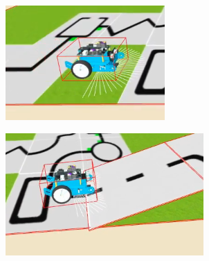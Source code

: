 \begin{itemize}
\begin{figure}[h!]
\begin{subfigure}[b]{0.3\textwidth}
    \includegraphics[width=\textwidth, height=\textwidth]{rampa 2.png}
  \end{subfigure}
    \hfill
  \begin{subfigure}[b]{0.3\textwidth}
    \includegraphics[width=\textwidth, height=\textwidth]{rampa3.png}

\end{subfigure}
\end{figure}
\end{itemize}
